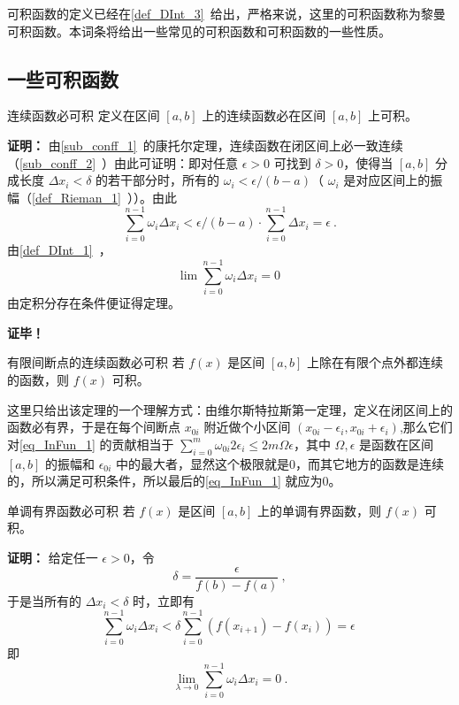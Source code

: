 
\begin{issues}
\end{issues}

可积函数的定义已经在\autoref{def_DInt_3}~给出，严格来说，这里的可积函数称为黎曼可积函数。本词条将给出一些常见的可积函数和可积函数的一些性质。
\subsection{一些可积函数}
\begin{theorem}{连续函数必可积}
定义在区间 $[a,b]$ 上的连续函数必在区间 $[a,b]$ 上可积。
\end{theorem}
\textbf{证明：}
由\autoref{sub_conff_1}~的康托尔定理，连续函数在闭区间上必一致连续（\autoref{sub_conff_2}~）由此可证明：即对任意 $\epsilon>0$ 可找到 $\delta>0$，使得当 $[a,b]$ 分成长度 $\Delta x_i<\delta$ 的若干部分时，所有的 $\omega_i<\epsilon/(b-a)$（ $\omega_i$ 是对应区间上的振幅（\autoref{def_Rieman_1}~））。由此
\begin{equation}
\sum_{i=0}^{n-1}\omega_i\Delta x_i<\epsilon/(b-a)\cdot\sum_{i=0}^{n-1}\Delta x_i=\epsilon~.
\end{equation}
由\autoref{def_DInt_1}~，
\begin{equation}\label{eq_InFun_1}
\lim\sum_{i=0}^{n-1}\omega_i\Delta x_i=0~
\end{equation}
由定积分存在条件便证得定理。

\textbf{证毕！}

\begin{theorem}{有限间断点的连续函数必可积}
若 $f(x)$ 是区间 $[a,b]$ 上除在有限个点外都连续的函数，则 $f(x)$ 可积。
\end{theorem}
这里只给出该定理的一个理解方式：由维尔斯特拉斯第一定理，定义在闭区间上的函数必有界，于是在每个间断点 $x_{0i}$ 附近做个小区间 $(x_{0i}-\epsilon_i,x_{0i}+\epsilon_i)$,那么它们对\autoref{eq_InFun_1} 的贡献相当于 $\sum_{i=0}^{m}\omega_{0i}2\epsilon_i\leq2m\Omega\epsilon $，其中 $\Omega,\epsilon$ 是函数在区间 $[a,b]$ 的振幅和 $\epsilon_{0i}$ 中的最大者，显然这个极限就是0，而其它地方的函数是连续的，所以满足可积条件，所以最后的\autoref{eq_InFun_1} 就应为0。 

\begin{theorem}{单调有界函数必可积}
若 $f(x)$ 是区间 $[a,b]$ 上的单调有界函数，则 $f(x)$ 可积。
\end{theorem}
\textbf{证明：}
给定任一 $\epsilon>0$，令 
\begin{equation}
\delta=\frac{\epsilon}{f(b)-f(a)}~,
\end{equation}
于是当所有的 $\Delta x_i<\delta$ 时，立即有
\begin{equation}
\sum_{i=0}^{n-1}\omega_i\Delta x_i<\delta\sum_{i=0}^{n-1}(f(x_{i+1})-f(x_i))=\epsilon~
\end{equation}
即 
\begin{equation}
\lim_{\lambda\rightarrow0}\sum_{i=0}^{n-1}\omega_i\Delta x_i=0~.
\end{equation}

